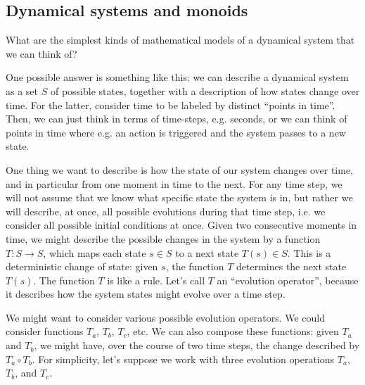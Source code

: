 \subsection{Dynamical systems and monoids}


What are the simplest kinds of mathematical models of a dynamical system that we can think of?

One possible answer is something like this: we can describe a dynamical system as a set $S$ of possible states, together with a description of how states change over time. For the latter, consider time to be labeled by distinct ``points in time''. Then, we can just think in terms of time-steps, e.g. seconds, or we can think of points in time where e.g. an action is triggered and the system passes to a new state.

One thing we want to describe is how the state of our system changes over time, and in particular from one moment in time to the next. For any time step, we will not assume that we know what specific state the system is in, but rather we will describe, at once, all possible evolutions during that time step, i.e. we consider all possible initial conditions at once. Given two consecutive moments in time, we might describe the possible changes in the system by a function $T : S \rightarrow S$, which maps each state $s \in S$ to a next state $T(s) \in S$. This is a deterministic change of state: given $s$, the function $T$ determines the next state $T(s)$. The function $T$ is like a rule. Let's call $T$ an ``evolution operator'', because it describes how the system states might evolve over a time step.

We might want to consider various possible evolution operators. We could consider functions $T_a$, $T_b$, $T_c$, etc. We can also compose these functions: given $T_a$ and $T_b$, we might have, over the course of two time steps, the change described by $T_a \circ T_b$. For simplicity, let's suppose we work with three evolution operations $T_a$, $T_b$, and $T_c$.

\


\








